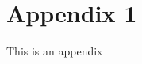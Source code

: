 \documentclass[class=report,11pt,crop=false]{standalone}
\begin{document}
\chapter{Appendix 1}

This is an appendix

\end{document}
